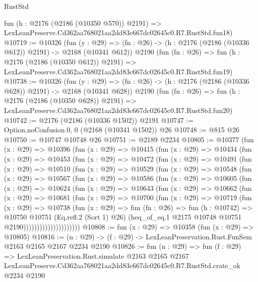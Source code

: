 \begin{lexlean}{RustStd}
\begin{coremodule}
    fun (h : @2176 (@2186 (@10350 @570)) @2191) =>
    LexLeanPreserve.Cd362aa768021aa2dd83c667dc02645c0.R7.RustStd.fun18)
@10719 := @10326
    (fun (y : @29) => (fn : @26) -> (h : @2176 (@2186 (@10336 @612)) @2191) -> @2168 (@10341 @612))
    @2190
    (fun (fn : @26) =>
    fun (h : @2176 (@2186 (@10350 @612)) @2191) =>
    LexLeanPreserve.Cd362aa768021aa2dd83c667dc02645c0.R7.RustStd.fun19)
@10738 := @10326
    (fun (y : @29) => (fn : @26) -> (h : @2176 (@2186 (@10336 @628)) @2191) -> @2168 (@10341 @628))
    @2190
    (fun (fn : @26) =>
    fun (h : @2176 (@2186 (@10350 @628)) @2191) =>
    LexLeanPreserve.Cd362aa768021aa2dd83c667dc02645c0.R7.RustStd.fun20)
@10742 := @2176 (@2186 (@10336 @1502)) @2191
@10747 := Option.noConfusion.{0, 0} (@2168 (@10341 @1502)) @26
@10748 := @815 @26
@10750 := @10747 @10748 @26
@10751 := @2189 @2234
@10805 := @10377
    (fun (x : @29) =>
    @10396
      (fun (x : @29) =>
      @10415
        (fun (x : @29) =>
        @10434
          (fun (x : @29) =>
          @10453
            (fun (x : @29) =>
            @10472
              (fun (x : @29) =>
              @10491
                (fun (x : @29) =>
                @10510
                  (fun (x : @29) =>
                  @10529
                    (fun (x : @29) =>
                    @10548
                      (fun (x : @29) =>
                      @10567
                        (fun (x : @29) =>
                        @10586
                          (fun (x : @29) =>
                          @10605
                            (fun (x : @29) =>
                            @10624
                              (fun (x : @29) =>
                              @10643
                                (fun (x : @29) =>
                                @10662
                                  (fun (x : @29) =>
                                  @10681
                                    (fun (x : @29) =>
                                    @10700
                                      (fun (x : @29) =>
                                      @10719
                                        (fun (x : @29) =>
                                        @10738
                                          (fun (x : @29) =>
                                          fun (fn : @26) =>
                                          fun (h : @10742) =>
                                          @10750
                                            @10751
                                            (Eq.refl.{2} (Sort 1) @26)
                                            (heq_of_eq.{1}
                                              @2175
                                              @10748
                                              @10751
                                              @2190)))))))))))))))))))))
@10808 := fun (x : @29) => @10358 (fun (x : @29) => @10805)
@10816 := (n : @29) -> (f : @29) -> LexLeanPreservation.Rust.FunSem @2163 @2165 @2167 @2234 @2190
@10826 := fun (n : @29) =>
  fun (f : @29) =>
  LexLeanPreservation.Rust.simulate
    @2163
    @2165
    @2167
    LexLeanPreserve.Cd362aa768021aa2dd83c667dc02645c0.R7.RustStd.crate_ok
    @2234
    @2190
\end{coremodule}
\end{lexlean}

